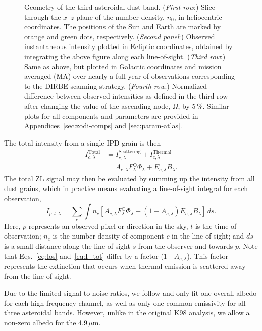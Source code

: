 \documentclass[twocolumn]{aa}
\begin{document}
\begin{figure}
  \caption{Geometry of the third asteroidal dust band. (\textit{First row}:)
    Slice through the $x$--$z$ plane of the number density, $n_{0}$,
    in heliocentric coordinates. The positions of the Sun and Earth
    are marked by orange and green dots, respectively. (\textit{Second
    panel}:) Observed instantaneous intensity plotted in Ecliptic
    coordinates, obtained by integrating the above figure along each
    line-of-sight. (\textit{Third row}:) Same as above, but plotted in
  Galactic coordinates and mission averaged (MA) over nearly a full year of
  observations corresponding to the DIRBE scanning strategy. 
  (\textit{Fourth row}:) Normalized difference between observed
  intensities as defined in the third row after changing the value of
  the ascending node, $\Omega$, by 5\,\%. Similar plots for all
  components and parameters are provided in 
  Appendices~\ref{sec:zodi-comps} and \ref{sec:param-atlas}.}
  \label{fig:band3}
\end{figure}

The total intensity from a single IPD grain is then
\begin{align}\label{eq:I_tot}
    I^\mathrm{Total}_{c, \lambda} &= I^\mathrm{Scattering}_{c,\lambda} + I^\mathrm{Thermal}_{c,\lambda}\\
    &= A_{c, \lambda} F_\lambda^\odot \Phi_\lambda + E_{c,\lambda} B_\lambda.
\end{align}
The total ZL signal may then be evaluated by summing up the intensity
from all dust grains, which in practice means evaluating a line-of-sight 
integral for each observation,
\begin{equation}\label{eq:los}
    I_{p,t, \lambda} = \sum_c \int n_c \left[  A_{c, \lambda} F_\lambda^\odot \Phi_\lambda + \left( 1 - A_{c, \lambda} \right) E_{c,\lambda} B_\lambda \right]\,ds.
\end{equation}
Here, $p$ represents an observed pixel or direction in the sky, $t$ is
the time of observation; $n_c$ is the number density of component $c$
in the line-of-sight; and $ds$ is a small distance along the
line-of-sight $s$ from the observer and towards $p$. Note that
Eqs.~\eqref{eq:los} and~\eqref{eq:I_tot} differ by a factor (1 -
$A_{c, \lambda}$). This factor represents the extinction that occurs
when thermal emission is scattered away from the line-of-sight.

Due to the limited signal-to-noise ratios, we follow
\citet{Kelsall1998} and only fit one overall albedo for each
high-frequency channel, as well as only one common emissivity for all
three asteroidal bands. However, unlike in the original K98 analysis,
we allow a non-zero albedo for the 4.9\,$\mu$m.
\end{document}

